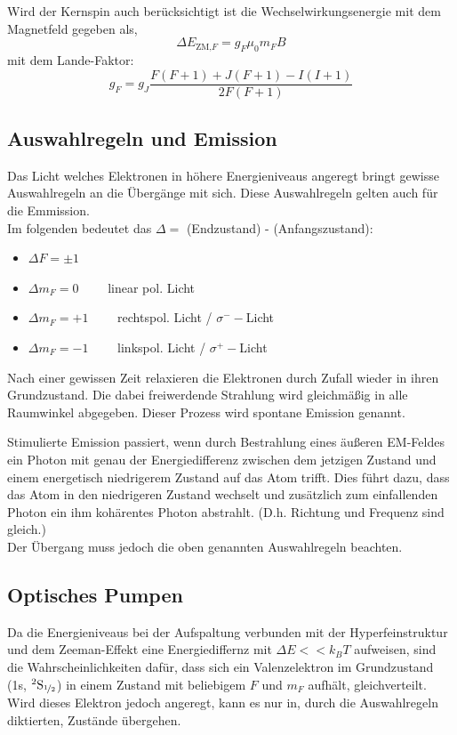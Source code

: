             Wird der Kernspin auch berücksichtigt ist die Wechselwirkungsenergie mit dem Magnetfeld gegeben als,
            \begin{equation*}
                \Delta E_{\text{ZM,}F} = g_F \mu_0 m_F B
            \end{equation*}
            mit dem Lande-Faktor:
            \begin{equation}
                g_F = g_J \frac{F(F+1) + J(F+1) - I(I+1)}{2F(F+1)}
                \label{eqn:g_F}
            \end{equation}

    \subsection{Auswahlregeln und Emission}
        Das Licht welches Elektronen in höhere Energieniveaus angeregt bringt gewisse Auswahlregeln an die Übergänge mit sich. Diese Auswahlregeln gelten auch für die Emmission.\\
        Im folgenden bedeutet das $\Delta = $ (Endzustand) - (Anfangszustand):
        \begin{itemize}
            \item $\Delta F = \pm 1$
            \item $\Delta m_F = 0 \qquad$ linear pol. Licht
            \item $\Delta m_F = +1 \qquad$ rechtspol. Licht / $\sigma^- -$Licht
            \item $\Delta m_F = -1 \qquad$ linkspol. Licht / $\sigma^+ -$Licht
        \end{itemize}
        Nach einer gewissen Zeit relaxieren die Elektronen durch Zufall wieder in ihren Grundzustand. Die dabei freiwerdende Strahlung wird gleichmäßig in alle Raumwinkel abgegeben. Dieser Prozess wird spontane Emission genannt.

        Stimulierte Emission passiert, wenn durch Bestrahlung eines äußeren EM-Feldes ein Photon mit genau der Energiedifferenz zwischen dem jetzigen Zustand und einem energetisch niedrigerem Zustand auf das Atom trifft. Dies führt dazu, dass das Atom in den niedrigeren Zustand wechselt und zusätzlich zum einfallenden Photon ein ihm kohärentes Photon abstrahlt. (D.h. Richtung und Frequenz sind gleich.)\\
        Der Übergang muss jedoch die oben genannten Auswahlregeln beachten.

    \subsection{Optisches Pumpen}        
        Da die Energieniveaus bei der Aufspaltung verbunden mit der Hyperfeinstruktur und dem Zeeman-Effekt eine Energiediffernz mit $\Delta E << k_B T$ aufweisen, sind die Wahrscheinlichkeiten dafür, dass sich ein Valenzelektron im Grundzustand (1s, $^2\text{S}_{\nicefrac{1}{2}}$) in einem Zustand mit beliebigem $F$ und $m_F$ aufhält, gleichverteilt. Wird dieses Elektron jedoch angeregt, kann es nur in, durch die Auswahlregeln diktierten, Zustände übergehen.

